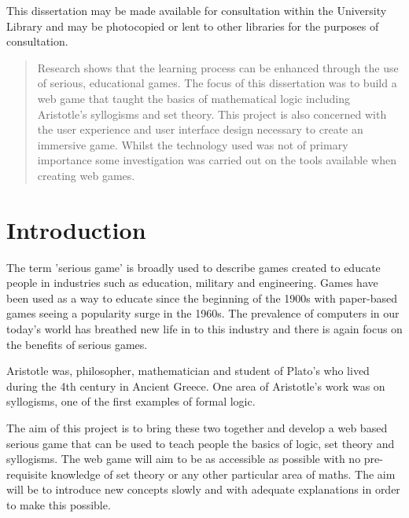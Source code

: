 \documentclass[12pt,a4paper]{report}
\begin{document}
\newpage
\clearpage
\thispagestyle{empty}
\vspace*{\fill}
\begin{center}
\begin{minipage}{.8\textwidth}
This dissertation may be made available for consultation within the University
Library and may be photocopied or lent to other libraries for the purposes of consultation.

\end{minipage}
\end{center}
\vfill %
\clearpage

\begin{abstract}
Research shows that the learning process can be enhanced through the use of serious, educational games. The focus of this dissertation was to build a web game that taught the basics of mathematical logic including Aristotle's syllogisms and set theory. This project is also concerned with the user experience and user interface design necessary to create an immersive game. Whilst the technology used was not of primary importance some investigation was carried out on the tools available when creating web games.
\end{abstract}

\cleardoublepage
{}
\tableofcontents
\cleardoublepage
{}
\setcounter{page}{1} %
\chapter{Introduction}
The term 'serious game' is broadly used to describe games created to educate people in industries such as education, military and engineering. Games have been used as a way to educate since the beginning of the 1900s with paper-based games seeing a popularity surge in the 1960s. The prevalence of computers in our today's world has breathed new life in to this industry and there is again focus on the benefits of serious games.


Aristotle was, philosopher, mathematician and student of Plato's who lived during the 4th century in Ancient Greece. One area of Aristotle's work was on syllogisms, one of the first examples of formal logic.

The aim of this project is to bring these two together and develop a web based serious game that can be used to teach people the basics of logic, set theory and syllogisms. The web game will aim to be as accessible as possible with no pre-requisite knowledge of set theory or any other particular area of maths. The aim will be to introduce new concepts slowly and with adequate explanations in order to make this possible.
\end{document}
